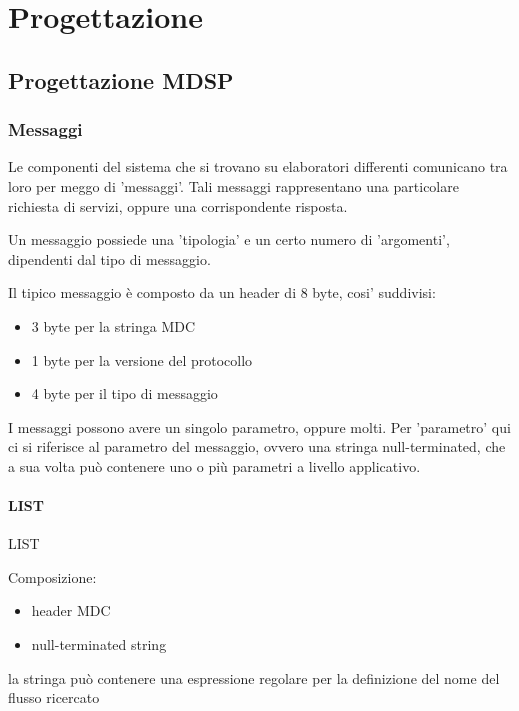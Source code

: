 \chapter{Progettazione}

\section{Progettazione MDSP}
\subsection{Messaggi}


Le componenti del sistema che si trovano su elaboratori differenti comunicano tra loro per meggo di 'messaggi'. Tali messaggi rappresentano una particolare richiesta di servizi, oppure una corrispondente risposta.

Un messaggio possiede una 'tipologia' e un certo numero di 'argomenti', dipendenti dal tipo di messaggio.

Il tipico messaggio è composto da un header di 8 byte, cosi' suddivisi:



\begin{itemize}
\item 3 byte per la stringa MDC

\item 1 byte per la versione del protocollo

\item 4 byte per il tipo di messaggio
\end{itemize}

I messaggi possono avere un singolo parametro, oppure molti. Per 'parametro' qui ci si riferisce al parametro del messaggio, ovvero una stringa null-terminated, che a sua volta può contenere uno o più parametri a livello applicativo.






\subsubsection{LIST}
%
LIST

Composizione:

\begin{itemize}
\item header MDC
\item null-terminated string
\end{itemize}

la stringa può contenere una espressione regolare per la definizione del nome del
flusso ricercato


